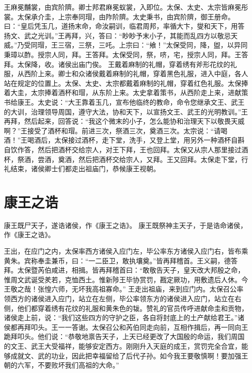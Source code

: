 \documentclass[12pt,UTF8]{ctexbook}
\begin{document}
王麻冕黼裳，由宾阶隮。卿士邦君麻冕蚁裳，入即位。太保、太史、太宗皆麻冕彤裳。太保承介圭，上宗奉同瑁，由阼阶隮。太史秉书，由宾阶隮，御王册命。曰：“皇后凭玉几，道扬末命，命汝嗣训，临君周邦，率循大卞，燮和天下，用答扬文、武之光训。”王再拜，兴，答曰：“眇眇予末小子，其能而乱四方以敬忌天威。”乃受同瑁，王三宿，三祭，三吒。上宗曰：“飨！”太保受同，降，盥，以异同秉璋以酢。授宗人同，拜。王答拜。太保受同，祭，哜，宅，授宗人同，拜。王答拜。太保降，收。诸侯出庙门俟。
王戴着麻制的礼帽，穿着绣有斧形花纹的礼服，从西阶上来。卿士和众诸侯戴着麻制的礼帽，穿着黑色礼服，进入中庭，各人站在规定的位置上。太保、太史、太宗都戴着麻制的礼帽，穿着红色礼服。太保捧着大圭，太宗捧着酒杯和瑁，从东阶上来。太史拿着策书，从西阶走上来，进献策书给康王。太史说：“大王靠着玉几，宣布他临终的教命，命令您继承文王、武王的大训，治理领导周国，遵守大法，协和天下，以宣扬文王、武王的光明教训。”王再拜，然后起来，回答说：“我这个微末的小子，怎么能协和治理天下以敬畏天威啊？”王接受了酒杯和瑁。前进三次，祭酒三次，奠酒三次。太宗说：“请喝酒！”王喝酒后，太保接过酒杯，走下堂，洗手，又登上堂，用另外一种酒杯自斟自饮作答，然后把酒杯交给宗人，对王下拜，王也回拜。太保又从宗人那里接过酒杯，祭酒，尝酒，奠酒，然后把酒杯交给宗人，又拜。王又回拜。太保走下堂，行礼结束，诸侯卿士们都走出祖庙门，恭候康王视朝。

\chapter{康王之诰}

康王既尸天子，遂诰诸侯，作《康王之诰》。
康王既祭神主天子，于是诰命诸侯，作《康王之诰》。

王出，在应门之内，太保率西方诸侯入应门左，毕公率东方诸侯入应门右，皆布乘黄朱。宾称奉圭兼币，曰：“一二臣卫，敢执壤奠。”皆再拜稽首。王义嗣，德答拜。太保暨芮伯咸进，相揖。皆再拜稽首曰：“敢敬告天子，皇天改大邦殷之命，惟周文武诞受羑若，克恤西土。惟新陟王毕协赏罚，戡定厥功，用敷遗后人休。今王敬之哉！张惶六师，无坏我高祖寡命。”
王走出祖庙，来到应门内。太保召公率领西方的诸侯进入应门，站立在左侧，毕公率领东方的诸侯进入应门，站立在右侧，他们都穿着绣有花纹的礼服和黄朱色的韨。赞礼的官员传呼进献命圭和贡物，诸侯走上前，说：“我们这些四方的守护之臣，各自将封底上的土产献给君王。”诸侯都再拜叩头。王一一答谢。太保召公和芮伯同走向前，互相作揖后，再一同向王跪拜叩头。他们说：“恭敬地禀告天子，上天已经更改了大国殷的命运，我们周国的文王、武王大受福祥，能够安定西方。刚刚升入天庭的成王，赏罚完全合宜，能够成就文、武的功业，因此把幸福留给了后代子孙。如今我王要敬慎啊！要加强王朝的六军，不要败坏我们高祖的大命。”
\end{document}
